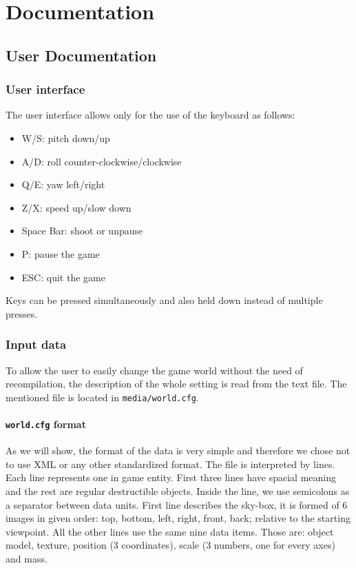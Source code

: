 \chapter*{Documentation}
\section*{User Documentation}

\subsection*{User interface}
The user interface allows only for the use of the keyboard as follows:
\begin{itemize}
\item W/S: pitch down/up
\item A/D: roll counter-clockwise/clockwise 
\item Q/E: yaw left/right
\item Z/X: speed up/slow down
\item Space Bar: shoot or unpause
\item P: pause the game
\item ESC: quit the game
\end{itemize}
Keys can be pressed simultaneously and also held down instead of multiple presses.

\subsection*{Input data}
\label{sec:data}
To allow the user to easily change the game world without the need of recompilation, the description of the whole setting is read from the text file. The mentioned file is located in {\tt media/world.cfg}. 
\subsubsection*{{\tt world.cfg} format}
As we will show, the format of the data is very simple and therefore we chose not to use XML or any other standardized format. The file is interpreted by lines. Each line represents one in game entity. First three lines have spacial meaning and the rest are regular destructible objects.
Inside the line, we use semicolons as a separator between data units.
First line describes the sky-box, it is formed of 6 images in given order: top, bottom, left, right, front, back; relative to the starting viewpoint. All the other lines use the same nine data items. Those are: object model, texture, position (3 coordinates), scale (3 numbers, one for every axes) and mass.

